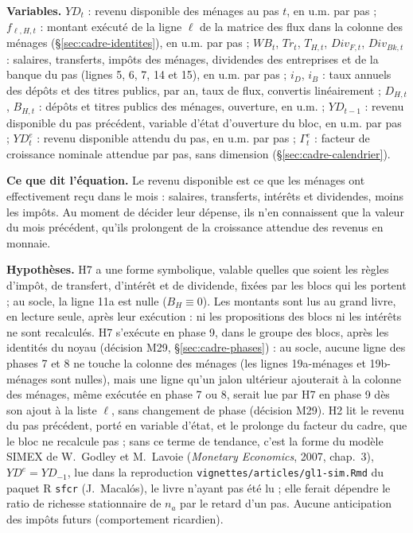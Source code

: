 \documentclass[11pt,a4paper]{article}
\newcommand{\variables}{\par\noindent\textbf{Variables.} }
\newcommand{\sens}{\par\noindent\textbf{Ce que dit l'équation.} }
\newcommand{\hyp}{\par\noindent\textbf{Hypothèses.} }
\begin{document}
\begin{proposee}
\variables $\mathit{YD}_t$ : revenu disponible des ménages au pas $t$, en u.m. par pas ; $f_{\ell,H,t}$ : montant exécuté de la ligne $\ell$ de la matrice des flux dans la colonne des ménages (\S\ref{sec:cadre-identites}), en u.m. par pas ; $\mathit{WB}_t$, $\mathit{Tr}_t$, $T_{H,t}$, $\mathit{Div}_{F,t}$, $\mathit{Div}_{\mathit{Bk},t}$ : salaires, transferts, impôts des ménages, dividendes des entreprises et de la banque du pas (lignes 5, 6, 7, 14 et 15), en u.m. par pas ; $i_D$, $i_B$ : taux annuels des dépôts et des titres publics, par an, taux de flux, convertis linéairement ; $D_{H,t}$, $B_{H,t}$ : dépôts et titres publics des ménages, ouverture, en u.m. ; $\mathit{YD}_{t-1}$ : revenu disponible du pas précédent, variable d'état d'ouverture du bloc, en u.m. par pas ; $\mathit{YD}^e_t$ : revenu disponible attendu du pas, en u.m. par pas ; $\Gamma^e_t$ : facteur de croissance nominale attendue par pas, sans dimension (\S\ref{sec:cadre-calendrier}).
\sens Le revenu disponible est ce que les ménages ont effectivement reçu dans le mois : salaires, transferts, intérêts et dividendes, moins les impôts. Au moment de décider leur dépense, ils n'en connaissent que la valeur du mois précédent, qu'ils prolongent de la croissance attendue des revenus en monnaie.
\hyp H7 a une forme symbolique, valable quelles que soient les règles d'impôt, de transfert, d'intérêt et de dividende, fixées par les blocs qui les portent ; au socle, la ligne 11a est nulle ($B_H \equiv 0$). Les montants sont lus au grand livre, en lecture seule, après leur exécution : ni les propositions des blocs ni les intérêts ne sont recalculés. H7 s'exécute en phase 9, dans le groupe des blocs, après les identités du noyau (décision M29, \S\ref{sec:cadre-phases}) : au socle, aucune ligne des phases 7 et 8 ne touche la colonne des ménages (les lignes 19a-ménages et 19b-ménages sont nulles), mais une ligne qu'un jalon ultérieur ajouterait à la colonne des ménages, même exécutée en phase 7 ou 8, serait lue par H7 en phase 9 dès son ajout à la liste $\ell$, sans changement de phase (décision M29). H2 lit le revenu du pas précédent, porté en variable d'état, et le prolonge du facteur du cadre, que le bloc ne recalcule pas ; sans ce terme de tendance, c'est la forme du modèle SIMEX de W.~Godley et M.~Lavoie (\emph{Monetary Economics}, 2007, chap.~3), $\mathit{YD}^e = \mathit{YD}_{-1}$, lue dans la reproduction \nolinkurl{vignettes/articles/gl1-sim.Rmd} du paquet R \texttt{sfcr} (J.~Macalós), le livre n'ayant pas été lu ; elle ferait dépendre le ratio de richesse stationnaire de $n_a$ par le retard d'un pas. Aucune anticipation des impôts futurs (comportement ricardien).

\end{proposee}
\end{document}

